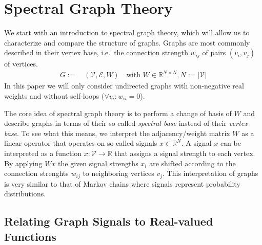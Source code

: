 \section{Spectral Graph Theory}%
\label{sec:sgt}

We start with an introduction to spectral graph theory, which will allow us to characterize and compare the structure of graphs.
Graphs are most commonly described in their vertex base, i.e.\  the connection strength $w_{i j}$ of pairs $(v_i, v_j)$ of vertices.
\begin{align*}
	G :=&\, (\mathcal{V}, \mathcal{E}, W)\quad\text{with } W \in \mathbb{R}^{N \times N}, N := |\mathcal{V}|
\end{align*}
In this paper we will only consider undirected graphs with non-negative real weights and without self-loops ($\forall v_i: w_{i i} = 0$).

The core idea of spectral graph theory is to perform a change of basis of $W$ and describe graphs in terms of their so called \textit{spectral base} instead of their \textit{vertex base}.
To see what this means, we interpret the adjacency/weight matrix $W$ as a linear operator that operates on so called signals $x \in \mathbb{R}^N$.
A signal $x$ can be interpreted as a function $x: \mathcal{V} \to \mathbb{R}$ that assigns a signal strength to each vertex.
By applying $Wx$ the given signal strengths $x_i$ are shifted according to the connection strenghts $w_{i j}$ to neighboring vertices $v_j$.
This interpretation of graphs is very similar to that of Markov chains where signals represent probability distributions.

\subsection{Relating Graph Signals to Real-valued Functions}%
\label{sec:sgt:real}


